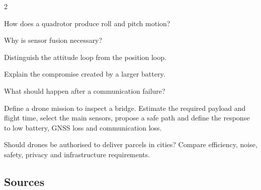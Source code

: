 \begin{multicols}{2}
\begin{questions}
\item How does a quadrotor produce roll and pitch motion?
\item Why is sensor fusion necessary?
\item Distinguish the attitude loop from the position loop.
\item Explain the compromise created by a larger battery.
\item What should happen after a communication failure?
\end{questions}

\begin{engineeringchallenge}
Define a drone mission to inspect a bridge. Estimate the required payload and flight time, select the
main sensors, propose a safe path and define the response to low battery, GNSS loss and communication
loss.
\end{engineeringchallenge}

\begin{speaking}
Should drones be authorised to deliver parcels in cities? Compare efficiency, noise, safety, privacy
and infrastructure requirements.
\end{speaking}
\end{multicols}

\subsection*{Sources}
